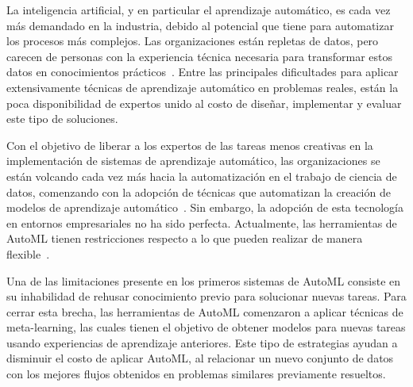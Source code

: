 \begin{conclusions}\label{conclusion}

\qquad 


La inteligencia artificial, y en particular el aprendizaje automático, es cada vez más demandado en la industria, debido al potencial que tiene para automatizar los procesos más complejos. Las organizaciones están repletas de datos, pero carecen de personas con la experiencia técnica necesaria para transformar estos datos en conocimientos prácticos~\cite{miller2017quant}. Entre las principales dificultades para aplicar extensivamente técnicas de aprendizaje automático en problemas reales, están la poca disponibilidad de expertos unido al costo de diseñar, implementar y evaluar este tipo de soluciones. 

Con el objetivo de liberar a los expertos de las tareas menos creativas en la implementación de sistemas de aprendizaje automático, las organizaciones se están volcando cada vez más hacia la automatización en el trabajo de ciencia de datos, comenzando con la adopción de técnicas que automatizan la creación de modelos de aprendizaje automático~\cite{drozdal2020trust, wang2019humanai}. Sin embargo, la adopción de esta tecnología en entornos empresariales no ha sido perfecta. Actualmente, las herramientas de AutoML tienen restricciones respecto a lo que pueden realizar de manera flexible~\cite{crisan2021fits}. %

Una de las limitaciones presente en los primeros sistemas de AutoML consiste en su inhabilidad de rehusar conocimiento previo para solucionar nuevas tareas. Para cerrar esta brecha, las herramientas de AutoML comenzaron a aplicar técnicas de meta-learning, las cuales tienen el objetivo de obtener modelos para nuevas tareas usando experiencias de aprendizaje anteriores. Este tipo de estrategias ayudan a disminuir el costo de aplicar AutoML, al relacionar un nuevo conjunto de datos con los mejores flujos obtenidos en problemas similares previamente resueltos. 


\end{conclusions}
